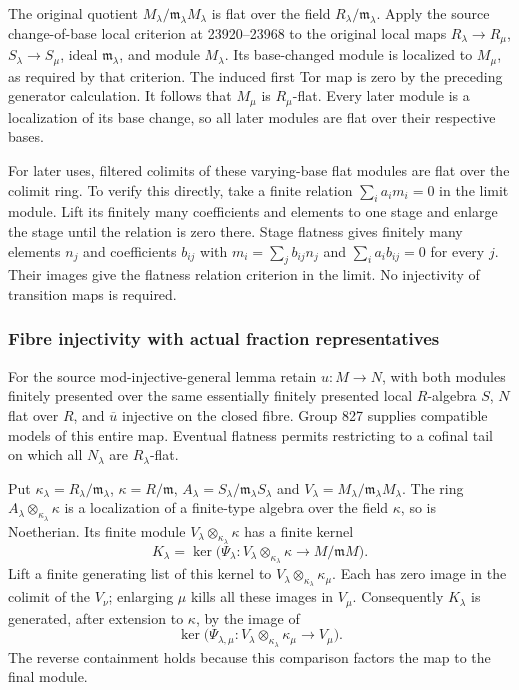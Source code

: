 The original quotient \(M_\lambda/\mathfrak m_\lambda M_\lambda\) is flat over the field \(R_\lambda/\mathfrak m_\lambda\). Apply the source change-of-base local criterion at 23920--23968 to the original local maps \(R_\lambda\to R_\mu\), \(S_\lambda\to S_\mu\), ideal \(\mathfrak m_\lambda\), and module \(M_\lambda\). Its base-changed module is localized to \(M_\mu\), as required by that criterion. The induced first Tor map is zero by the preceding generator calculation. It follows that \(M_\mu\) is \(R_\mu\)-flat. Every later module is a localization of its base change, so all later modules are flat over their respective bases.

For later uses, filtered colimits of these varying-base flat modules are flat over the colimit ring. To verify this directly, take a finite relation \(\sum_i a_i m_i=0\) in the limit module. Lift its finitely many coefficients and elements to one stage and enlarge the stage until the relation is zero there. Stage flatness gives finitely many elements \(n_j\) and coefficients \(b_{ij}\) with \(m_i=\sum_jb_{ij}n_j\) and \(\sum_i a_i b_{ij}=0\) for every \(j\). Their images give the flatness relation criterion in the limit. No injectivity of transition maps is required.

\subsubsection{Fibre injectivity with actual fraction representatives}\label{algebra-proof-038-fibre-injectivity-with-actual-fraction-representatives}

For the source mod-injective-general lemma retain \(u:M\to N\), with both modules finitely presented over the same essentially finitely presented local \(R\)-algebra \(S\), \(N\) flat over \(R\), and \(\overline u\) injective on the closed fibre. Group 827 supplies compatible models of this entire map. Eventual flatness permits restricting to a cofinal tail on which all \(N_\lambda\) are \(R_\lambda\)-flat.

Put \(\kappa_\lambda=R_\lambda/\mathfrak m_\lambda\), \(\kappa=R/\mathfrak m\), \(A_\lambda=S_\lambda/\mathfrak m_\lambda S_\lambda\) and \(V_\lambda=M_\lambda/\mathfrak m_\lambda M_\lambda\). The ring \(A_\lambda\otimes_{\kappa_\lambda}\kappa\) is a localization of a finite-type algebra over the field \(\kappa\), so is Noetherian. Its finite module \(V_\lambda\otimes_{\kappa_\lambda}\kappa\) has a finite kernel \[
K_\lambda=\ker\bigl(\Psi_\lambda:
 V_\lambda\otimes_{\kappa_\lambda}\kappa\longrightarrow M/\mathfrak mM\bigr).
\] Lift a finite generating list of this kernel to \(V_\lambda\otimes_{\kappa_\lambda}\kappa_\mu\). Each has zero image in the colimit of the \(V_\nu\); enlarging \(\mu\) kills all these images in \(V_\mu\). Consequently \(K_\lambda\) is generated, after extension to \(\kappa\), by the image of \[
\ker\bigl(\Psi_{\lambda,\mu}:
 V_\lambda\otimes_{\kappa_\lambda}\kappa_\mu\longrightarrow V_\mu\bigr).
\] The reverse containment holds because this comparison factors the map to the final module.

